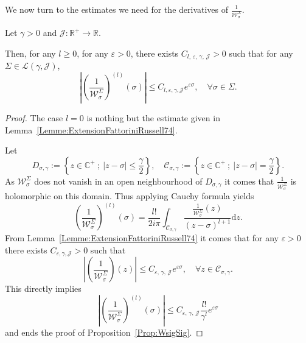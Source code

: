 \documentclass[AHL,Unicode,longabstracts]{cedram}
\newcommand{\R}{\mathbb{R}}
\newcommand{\C}{\mathbb{C}}
\newcommand{\md}{\mathrm{d}}
\let\oldforall\forall
\renewcommand*{\forall}{\mathrel{\oldforall}}
\begin{document}
We now turn to the estimates we need for the derivatives of $\frac{1}{\mathcal{W}^{\Sigma}_{\sigma}}$.

\begin{prop}\label{Prop:WsigSig}
Let $\gamma >0$ and $\mathcal{J} : \R^+ \to \R$.

Then, for any $l \geq 0$, for any $\varepsilon >0$, there exists $C_{l,\,\varepsilon,\,\gamma,\,\mathcal{J}}>0$ such that for any $\Sigma \in \mathcal{L}(\gamma, \mathcal{J})$,
\[
\left| \left(\frac{1}{\mathcal{W}^\Sigma_{\sigma}} \right)^{(l)} (\sigma) \right| \leq C_{l,\varepsilon, \gamma, \mathcal{J}} e^{\varepsilon \sigma}, \quad \forall \sigma \in \Sigma.
\]
\end{prop}

\begin{proof}
The case $l=0$ is nothing but the estimate given in Lemma~\ref{Lemme:ExtensionFattoriniRussell74}.

Let
\[
D_{\sigma,\gamma} := \left\{ z \in \C^+ \: ; \: |z-\sigma| \leq \frac{\gamma}{2} \right\},
\quad
\mathcal{C}_{\sigma,\gamma} := \left\{ z \in \C^+ \: ; \: |z-\sigma| = \frac{\gamma}{2} \right\}.
\]
As $\mathcal{W}^{\Sigma}_\sigma$ does not vanish in an open neighbourhood of $D_{\sigma, \gamma}$ it comes that $\frac{1}{\mathcal{W}^{\Sigma}_\sigma}$ is holomorphic on this domain. Thus applying Cauchy formula yields
\[
\left(\frac{1}{\mathcal{W}^\Sigma_\sigma} \right)^{(l)} (\sigma) = \frac{l!}{2i\pi} \int_{\mathcal{C}_{\sigma,\gamma}} \frac{\frac{1}{\mathcal{W}^\Sigma_\sigma}(z)}{(z-\sigma)^{l+1}} \md z.
\]
From Lemma~\ref{Lemme:ExtensionFattoriniRussell74} it comes that for any $\varepsilon>0$ there exists $C_{\varepsilon, \gamma, \mathcal{J}}>0$ such that
\[
\left| \left(\frac{1}{\mathcal{W}^\Sigma_\sigma} \right)(z) \right| \leq C_{\varepsilon,\,\gamma,\,\mathcal{J}} e^{\varepsilon \sigma}, \quad\forall z\in \mathcal{C}_{\sigma,\gamma}.
\]
This directly implies
\[
\left| \left(\frac{1}{\mathcal{W}^\Sigma_\sigma} \right)^{(l)}(\sigma) \right| \leq C_{\varepsilon,\,\gamma,\,\mathcal{J}} \frac{l!}{\gamma^l} e^{\varepsilon \sigma}
\]
and ends the proof of Proposition~\ref{Prop:WsigSig}.
\end{proof}
\end{document}
